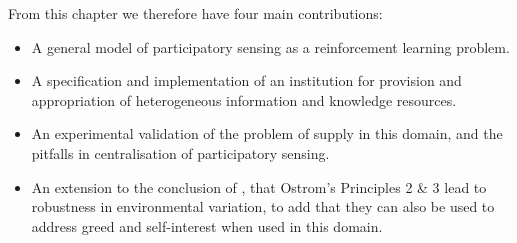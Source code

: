 From this chapter we therefore have four main contributions:
\begin{itemize}
\item A general model of participatory sensing as a reinforcement learning problem.
\item A specification and implementation of an institution for provision and appropriation of heterogeneous information and knowledge resources.
\item An experimental validation of the problem of supply in this domain, and the pitfalls in centralisation of participatory sensing.
\item An extension to the conclusion of \citet{Pitt2012b}, that Ostrom's Principles 2 \& 3 lead to robustness in environmental variation, to add that they can also be used to address greed and self-interest when used in this domain.
\end{itemize}


